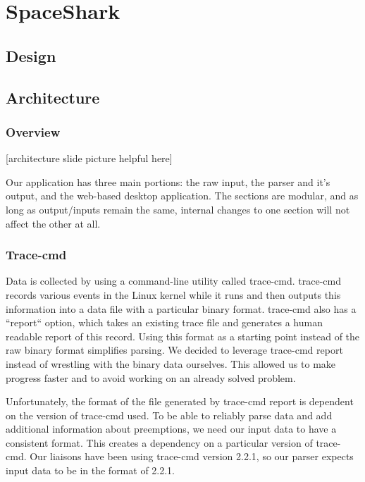 \documentclass{hmcclinic}
\begin{document}
\chapter{SpaceShark}
\section{Design}
\section{Architecture} %

  \subsection{Overview}

  [architecture slide picture helpful here]

  Our application has three main portions: the raw input, the parser and it's
  output, and the web-based desktop application. The sections are modular, and
  as long as output/inputs remain the same, internal changes to one section will
  not affect the other at all.

  \subsection{Trace-cmd}

  Data is collected by using a command-line utility called trace-cmd.
  trace-cmd records various events in the Linux kernel while it runs and then
  outputs this information into a data file with a particular binary format.
  trace-cmd also has a ``report`` option, which takes an existing trace file and
  generates a human readable report of this record. Using this format as a
  starting point instead of the raw binary format simplifies parsing.  We
  decided to leverage trace-cmd report instead of wrestling with the binary data
  ourselves. This allowed us to make progress faster and to avoid working on an
  already solved problem.

   Unfortunately, the format of the file generated by trace-cmd report is
   dependent on the version of trace-cmd used. To be able to reliably parse data
   and add additional information about preemptions, we need our input data to
   have a consistent format. This creates a dependency on a particular version
   of trace-cmd. Our liaisons have been using trace-cmd version 2.2.1, so our
   parser expects input data to be in the format of 2.2.1.
\end{document}

